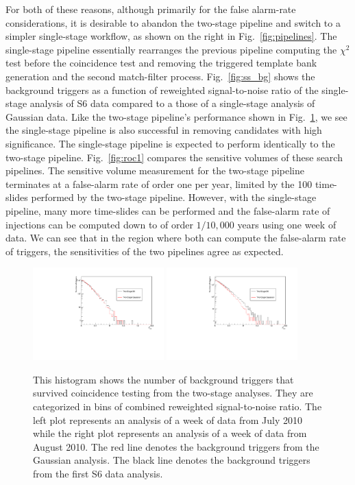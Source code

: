\documentclass[12pt]{iopart} \usepackage{graphicx,amssymb}
\begin{document}
For both of these reasons, although primarily for the false alarm-rate
considerations, it is desirable to abandon the two-stage pipeline and switch
to a simpler single-stage workflow, as shown on the right in
Fig.~\ref{fig:pipelines}.  The single-stage pipeline essentially rearranges
the previous pipeline computing the $\chi^2$ test before the coincidence test
and removing the triggered template bank generation and the second
match-filter process.  Fig.~\ref{fig:ss_bg} shows the background triggers
as a function of reweighted signal-to-noise ratio of the single-stage analysis 
of S6 data compared to a
those of a single-stage analysis of Gaussian data. Like the two-stage
pipeline's performance shown in Fig.~\ref{fig:2s_bg}, we see the
single-stage pipeline is also successful in removing candidates with high
significance.  The single-stage pipeline is expected to perform identically to
the two-stage pipeline. Fig.~\ref{fig:roc1} compares the sensitive volumes
of these search pipelines. The sensitive volume measurement for the two-stage
pipeline terminates at a false-alarm rate of order one per year, limited by
the 100 time-slides performed by the two-stage pipeline. However, with
the single-stage pipeline, many more time-slides can be performed and the
false-alarm rate of injections can be computed down to of order $1/10,000$
years using one week of data. We can see that in the region where both can
compute the false-alarm rate of triggers, the sensitivities of the two
pipelines agree as expected.

\begin{figure}[tbp]
\begin{center}
\includegraphics[width=0.45\textwidth]{figures/histograms/two_stage_hist_w1.pdf} 
\includegraphics[width=0.45\textwidth]{figures/histograms/two_stage_hist_w2.pdf} 
\caption{This histogram shows the number of background triggers that survived
coincidence testing from the two-stage analyses. They are categorized in bins
of combined reweighted signal-to-noise ratio. The left plot represents an 
analysis of a week of data from
July 2010 while the right plot represents an analysis of a week of data from August 2010. The
red line denotes the background triggers from the Gaussian analysis. The black
line denotes the background triggers from the first S6 data analysis.}
\label{fig:2s_bg}
\end{center}
\end{figure}
\end{document}

